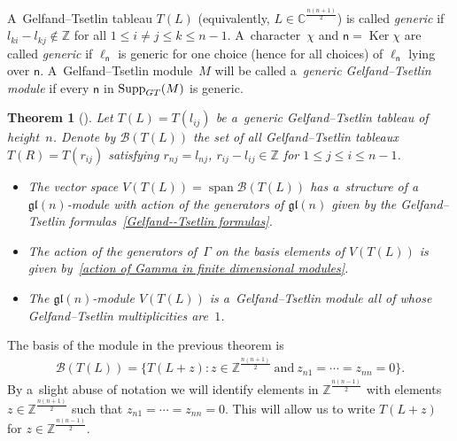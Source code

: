 \documentclass[11pt]{article}
\DeclareMathOperator\Span{span} \DeclareMathOperator\Ker{Ker}
\DeclareMathOperator\Supp{Supp} \DeclareMathOperator\codim{codim} \DeclareMathOperator\Y{Y}
\numberwithin{equation}{section}
\newtheorem{Theorem}{Theorem}[section]
\begin{document}
\begin{Definition}
\label{def-gen}
A~Gelfand--Tsetlin tableau $T(L)$ \big(equivalently, $L\in{\mathbb C}^{\frac{n(n+1)}{2}}$\big) is called \emph{generic} if
$l_{ki}-l_{kj}\notin\mathbb{Z}$ for all $1\leq i\neq j \leq k \leq n-1$.
A~character~$\chi$ and $\mathsf n = \Ker \chi$ are called \emph{generic} if $\ell_{\mathsf n}$ is generic for one choice
(hence for all choices) of $\ell_{\mathsf n}$ lying over $\mathsf n$.
A~Gelfand--Tsetlin module~$M$ will be called a~\emph{generic Gelfand--Tsetlin module} if every $\mathsf n$ in
$\Supp_{\rm GT}(M)$ is generic.
\end{Definition}

\begin{Theorem}[]%
Let $T(L) = T(l_{ij})$ be a~generic Gelfand--Tsetlin tableau of height~$n$.
Denote by ${\mathcal B}(T(L))$ the set of all Gelfand--Tsetlin tableaux $T(R) = T(r_{ij})$ satisfying $r_{nj}=l_{nj}$,
$r_{ij}-l_{ij}\in\mathbb{Z}$ for
$1\leq j\leq i \leq n-1$.
\begin{itemize}\itemsep=0pt
\item[$(i)$] The vector space $V(T(L)) = \Span {\mathcal B}(T(L))$ has a~structure of a~$\mathfrak{gl}(n)$-module with
action of the generators of $\mathfrak{gl}(n)$ given by the Gelfand--Tsetlin formulas~\eqref{Gelfand--Tsetlin formulas}.
\item[$(ii)$] The action of the generators of~$\Gamma$ on the basis elements of $V(T(L))$ is given by~\eqref{action of Gamma in finite dimensional modules}.
\item[$(iii)$] The $\mathfrak{gl}(n)$-module $V(T(L))$ is a~Gelfand--Tsetlin module all of whose Gelfand--Tsetlin
multiplicities are~$1$.
\end{itemize}
\end{Theorem}

\begin{Remark}

The basis of the module in the previous theorem is
\begin{gather*}
{\mathcal B}(T(L)) = \big\{T(L+z):z\in\mathbb{Z}^{\frac{n(n+1)}{2}}~\text{and}~z_{n1}=\cdots=z_{nn}=0\big\}.
\end{gather*}
By a~slight abuse of notation we will identify elements in $\mathbb{Z}^{\frac{n(n-1)}{2}}$ with elements
$z\in\mathbb{Z}^{\frac{n(n+1)}{2}}$ such that $z_{n1}=\cdots=z_{nn}=0$.
This will allow us to write $T(L+z)$ for $z\in\mathbb{Z}^{\frac{n(n-1)}{2}}$.
\end{Remark}
\end{document}
